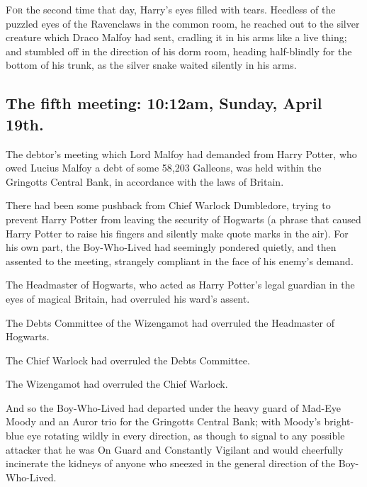 

\lettrine{F}{or} the second 
time that day, Harry's eyes filled with tears. Heedless of the puzzled eyes of 
the Ravenclaws in the common room, he reached out to the silver creature which 
Draco Malfoy had sent, cradling it in his arms like a live thing; and stumbled 
off in the direction of his dorm room, heading half-blindly for the bottom of 
his trunk, as the silver snake waited silently in his arms.
\sbreak
\vspace{-2\baselineskip}
\subsection{The fifth meeting: 10:12am, Sunday, April 19th.}

The debtor's meeting which Lord Malfoy had demanded from Harry Potter, who owed 
Lucius Malfoy a debt of some 58,203 Galleons, was held within the Gringotts 
Central Bank, in accordance with the laws of Britain.

There had been some pushback from Chief Warlock Dumbledore, trying to prevent 
Harry Potter from leaving the security of Hogwarts (a phrase that caused Harry 
Potter to raise his fingers and silently make quote marks in the air). For his 
own part, the Boy-Who-Lived had seemingly pondered quietly, and then assented 
to the meeting, strangely compliant in the face of his enemy's demand.

The Headmaster of Hogwarts, who acted as Harry Potter's legal guardian in the 
eyes of magical Britain, had overruled his ward's assent.

The Debts Committee of the Wizengamot had overruled the Headmaster of Hogwarts.

The Chief Warlock had overruled the Debts Committee.

The Wizengamot had overruled the Chief Warlock.

And so the Boy-Who-Lived had departed under the heavy guard of Mad-Eye Moody 
and an Auror trio for the Gringotts Central Bank; with Moody's bright-blue eye 
rotating wildly in every direction, as though to signal to any possible 
attacker that he was On Guard and Constantly Vigilant and would cheerfully 
incinerate the kidneys of anyone who sneezed in the general direction of the 
Boy-Who-Lived.


